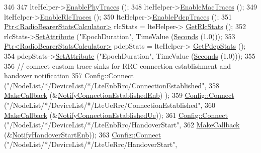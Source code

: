 \begin{DoxyCode}
346 
347   lteHelper->\hyperlink{classns3_1_1LteHelper_ad6d7edf234d29f7b8363e9ebf73fe32e}{EnablePhyTraces} ();
348   lteHelper->\hyperlink{classns3_1_1LteHelper_affa3a12841520407d3662417fe41863d}{EnableMacTraces} ();
349   lteHelper->\hyperlink{classns3_1_1LteHelper_abadfdd04d30b261e9b6f0846b4784928}{EnableRlcTraces} ();
350   lteHelper->\hyperlink{classns3_1_1LteHelper_adc62a53efe0437cf09062c9d6a95af3d}{EnablePdcpTraces} ();
351   \hyperlink{classns3_1_1Ptr}{Ptr<RadioBearerStatsCalculator>} rlcStats = lteHelper->
      \hyperlink{classns3_1_1LteHelper_a6eb438ccf69642e3863adea4991fa2ca}{GetRlcStats} ();
352   rlcStats->\hyperlink{classns3_1_1ObjectBase_ac60245d3ea4123bbc9b1d391f1f6592f}{SetAttribute} (\textcolor{stringliteral}{"EpochDuration"}, TimeValue (\hyperlink{group__timecivil_ga33c34b816f8ff6628e33d5c8e9713b9e}{Seconds} (1.0)));
353   \hyperlink{classns3_1_1Ptr}{Ptr<RadioBearerStatsCalculator>} pdcpStats = lteHelper->
      \hyperlink{classns3_1_1LteHelper_a1017c1f2ee9f5a640c50c25161a57758}{GetPdcpStats} ();
354   pdcpStats->\hyperlink{classns3_1_1ObjectBase_ac60245d3ea4123bbc9b1d391f1f6592f}{SetAttribute} (\textcolor{stringliteral}{"EpochDuration"}, TimeValue (\hyperlink{group__timecivil_ga33c34b816f8ff6628e33d5c8e9713b9e}{Seconds} (1.0)));
355 
356   \textcolor{comment}{// connect custom trace sinks for RRC connection establishment and handover notification}
357   \hyperlink{group__config_ga4014f151241cd0939b6cb64409605736}{Config::Connect} (\textcolor{stringliteral}{"/NodeList/*/DeviceList/*/LteEnbRrc/ConnectionEstablished"},
358                    \hyperlink{group__makecallbackmemptr_ga9376283685aa99d204048d6a4b7610a4}{MakeCallback} (&\hyperlink{lena-x2-handover-measures_8cc_a9ebcea277a72efa6dbfd310068addf75}{NotifyConnectionEstablishedEnb})
      );
359   \hyperlink{group__config_ga4014f151241cd0939b6cb64409605736}{Config::Connect} (\textcolor{stringliteral}{"/NodeList/*/DeviceList/*/LteUeRrc/ConnectionEstablished"},
360                    \hyperlink{group__makecallbackmemptr_ga9376283685aa99d204048d6a4b7610a4}{MakeCallback} (&\hyperlink{lena-x2-handover-measures_8cc_a7b068dcdfdae75954b1d6a533108413e}{NotifyConnectionEstablishedUe}));
361   \hyperlink{group__config_ga4014f151241cd0939b6cb64409605736}{Config::Connect} (\textcolor{stringliteral}{"/NodeList/*/DeviceList/*/LteEnbRrc/HandoverStart"},
362                    \hyperlink{group__makecallbackmemptr_ga9376283685aa99d204048d6a4b7610a4}{MakeCallback} (&\hyperlink{lena-x2-handover-measures_8cc_a98a48f4218409f1681fc99d3d070d8ee}{NotifyHandoverStartEnb}));
363   \hyperlink{group__config_ga4014f151241cd0939b6cb64409605736}{Config::Connect} (\textcolor{stringliteral}{"/NodeList/*/DeviceList/*/LteUeRrc/HandoverStart"},

\end{DoxyCode}
